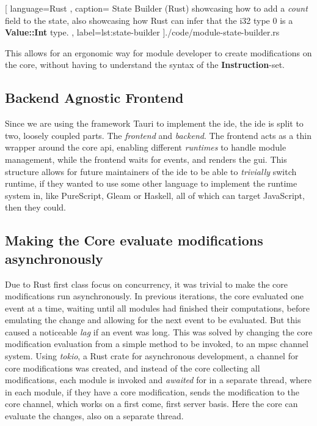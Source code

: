 \begin{center}
  
   [ language=Rust
   , caption={
     State Builder (Rust) showcasing how to add a \textit{count} field to the
     state, also showcasing how Rust can infer that the i32 type $0$ is
     a \textbf{Value::Int} type.
   }
   , label=lst:state-builder
   ]{./code/module-state-builder.rs}
\end{center}

This allows for an ergonomic way for module developer to create modifications on
the core, without having to understand the syntax of the
\textbf{Instruction}-set.

\subsection{Backend Agnostic Frontend}

Since we are using the framework Tauri to implement the \gls{ide}, the \gls{ide}
is split to two, loosely coupled parts. The \textit{frontend} and
\textit{backend}. The frontend acts as a thin wrapper around the core \gls{api},
enabling different \textit{runtimes} to handle module management, while the
frontend waits for events, and renders the \gls{gui}. This structure allows for
future maintainers of the \gls{ide} to be able to \textit{trivially} switch
runtime, if they wanted to use some other language to implement the runtime
system in, like PureScript, Gleam or Haskell, all of which can target
JavaScript, then they could.

\subsection{Making the Core evaluate modifications asynchronously}

Due to Rust first class focus on concurrency, it was trivial to make the core
modifications run asynchronously. In previous iterations, the core evaluated
one event at a time, waiting until all modules had finished their computations,
before emulating the change and allowing for the next event to be evaluated. But
this caused a noticeable \textit{lag} if an event was long. This was solved by
changing the core modification evaluation from a simple method to be invoked, to
an \gls{mpsc} channel system. Using \textit{tokio}, a Rust crate for
asynchronous development, a channel for core modifications was created, and
instead of the core collecting all modifications, each module is invoked and
\textit{awaited} for in a separate thread, where in each module, if they have a
core modification, sends the modification to the core channel, which works on
a first come, first server basis. Here the core can evaluate the changes, also
on a separate thread.

